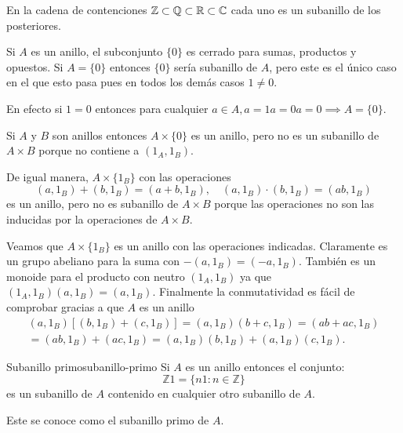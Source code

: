\begin{example}{}{}
    En la cadena de contenciones $\mathbb{Z} \subset \mathbb{Q} \subset \mathbb{R} \subset \mathbb{C}$ cada uno es un subanillo de los posteriores.
\end{example}

\begin{example}{}{}
    Si $A$ es un anillo, el subconjunto $\{0\}$ es cerrado para sumas, productos y opuestos. Si $A = \{0\}$ entonces $\{0\}$ sería subanillo de $A$, pero este es el único caso en el que esto pasa pues en todos los demás casos $1 \neq 0$.

    En efecto si $1=0$ entonces para cualquier $a \in A, a = 1a = 0a = 0 \implies A = \{0\}$.
\end{example}

\begin{example}{}{}
    Si $A$ y $B$ son anillos entonces $A \times \{0\}$ es un anillo, pero no es un subanillo de $A \times B$ porque no contiene a $(1_A, 1_B)$.

    De igual manera, $A \times \{1_B\}$ con las operaciones
    \[
    (a,1_B) + (b, 1_B) = (a+b, 1_B), \quad (a,1_B )\cdot (b, 1_B) = (ab, 1_B)
    \]
    es un anillo, pero no es subanillo de $A \times B$ porque las operaciones no son las inducidas por la operaciones de $A \times B$.
\end{example}

\begin{proofbox}
    Veamos que $A \times \{1_B\}$ es un anillo con las operaciones indicadas. Claramente es un grupo abeliano para la suma con $-(a,1_B) = (-a, 1_B)$. También es un monoide para el producto con neutro $(1_A, 1_B)$ ya que $(1_A, 1_B) (a, 1_B) = (a, 1_B)$. Finalmente la conmutatividad es fácil de comprobar gracias a que $A$ es un anillo
    \begin{align*}
        (a, 1_B)[(b, 1_B) + (c, 1_B)] = (a, 1_B)(b+c, 1_B) = (ab + ac, 1_B) \\
        = (ab, 1_B) + (ac, 1_B) = (a, 1_B)(b, 1_B) + (a, 1_B)(c, 1_B).
    \end{align*}
\end{proofbox}

\begin{example}{Subanillo primo}{subanillo-primo}
    Si \(A\) es un anillo entonces el conjunto:
    \[
    \mathbb{Z}1 = \{n1 : n \in \mathbb{Z}\}
    \]
    es un subanillo de \(A\) contenido en cualquier otro subanillo de \(A\). 
    
    Este se conoce como el subanillo primo de \(A\). 
\end{example}

